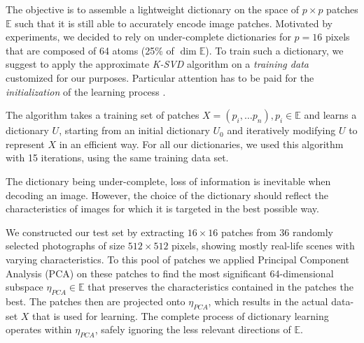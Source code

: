 The objective is to assemble a lightweight dictionary on the space of $p \times p$ patches $\mathbb{E}$ such that it is still able to accurately encode image patches. Motivated by experiments, we decided to rely on under-complete dictionaries for $p=16$ pixels that are composed of 64 atoms (25\% of $\dim\mathbb{E}$). To train such a dictionary, we suggest to apply the approximate \textit{K-SVD} algorithm on a \textit{training data} customized for our purposes. Particular attention has to be paid for the \textit{initialization} of the learning process \cite{CIL2015}. 

The algorithm takes a training set of patches $X = (p_i, \ldots p_n), p_i \in \mathbb{E}$ and learns a dictionary $U$, starting from an initial dictionary $U_0$ and iteratively modifying $U$ to represent $X$ in an efficient way. \cite{CIL2015} For all our dictionaries, we used this algorithm with 15 iterations, using the same training data set.

The dictionary being under-complete, loss of information is inevitable when decoding an image. However, the choice of the dictionary should reflect the characteristics of images for which it is targeted in the best possible way. 

We constructed our test set by extracting $16\times 16$ patches from 36 randomly selected photographs of size $512\times 512$ pixels, showing mostly real-life scenes with varying characteristics. To this pool of patches we applied Principal Component Analysis (PCA) on these patches to find the most significant 64-dimensional subspace $\eta_{PCA}\in\mathbb{E}$ that preserves the characteristics contained in the patches the best. The patches then are projected onto $\eta_{PCA}$, which results in the actual data-set $X$ that is used for learning. The complete process of dictionary learning operates within $\eta_{PCA}$, safely ignoring the less relevant directions of $\mathbb{E}$.

